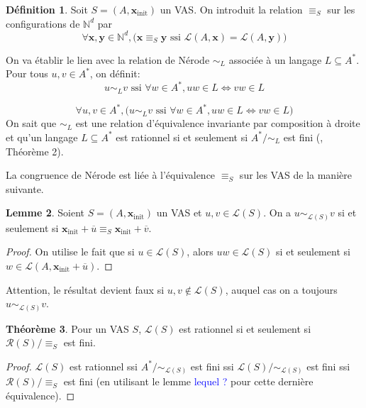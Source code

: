 \documentclass[a4paper,final]{article}
\theoremstyle{definition}
\newtheorem{Theorem}{Théorème}
\newtheorem{Definition}[Theorem]{Définition}
\newtheorem{Lemma}[Theorem]{Lemme}
\newcommand{\alain}[1]{\textcolor{blue}{#1}}
\newcommand{\N}{\ensuremath{\mathbb{N}}}
\newcommand{\lang}{\ensuremath{\mathcal{L}}}
\newcommand{\conf}{\ensuremath{\mathcal{R}}}
\newcommand{\vect}[1]{\ensuremath{\mathbf{#1}}}
\newcommand{\rel}{\ensuremath{\equiv}}
\newcommand{\ssi}{\ensuremath{\text{ ssi }}}
\newcommand{\equivaut}{\ensuremath{\Leftrightarrow}}
\newcommand{\xinit}{\ensuremath{\vect{x}_\text{init}}}
\newcommand{\valeur}[1]{\ensuremath{\overline{#1}}}
\begin{document}
\begin{Definition}
Soit $S=(A,\xinit)$ un VAS. On introduit la relation $\rel_S$ sur les configurations de $\N^d$ par
$$\forall \vect{x},\vect{y}\in\N^d, \Big(
\vect{x} \rel_S \vect{y} \ssi \lang(A,\vect{x}) = \lang(A,\vect{y}) \Big)$$
\end{Definition}


On va établir le lien avec la relation de Nérode $\sim_L$ associée à un langage $L \subseteq A^*$. Pour tous $u,v\in A^\ast$, on définit: 
 $$ u\sim_L v \ssi \forall w\in A^\ast, uw\in L \equivaut vw\in L $$

 $$\forall u,v\in A^\ast, \Big( u\sim_L v \ssi \forall w\in A^\ast, uw\in L \equivaut vw\in L \Big)$$
On sait que $\sim_L$ est une relation d'équivalence invariante par composition à droite et qu'un langage $L \subseteq A^*$ est rationnel si et seulement si $A^*/\sim_L$ est fini (\cite{rasc59}, Théorème 2).


La congruence de Nérode est liée à l'équivalence $ \rel_S$ sur les VAS de la manière suivante.

\begin{Lemma}
    Soient $S=(A,\xinit)$ un VAS et $u,v\in\lang(S)$.
    On a $u\sim_{\lang(S)}v$ si et seulement si $\xinit +\valeur{u} \rel_S \xinit +\valeur{v}$.
\end{Lemma}

\begin{proof}
On utilise le fait que si $u\in\lang(S)$, alors
$uw\in\lang(S)$ si et seulement si $w\in\lang(A,\xinit +\valeur{u})$.
\end{proof}

Attention, le résultat devient faux si $u,v\notin\lang(S)$, auquel cas on a toujours $u\sim_{\lang(S)}v$.


\begin{Theorem}
    Pour un VAS $S$, $\lang(S)$ est rationnel si et seulement si $\conf(S)/\rel_S$ est fini.
\end{Theorem}

\begin{proof}
$\lang(S)$ est rationnel 
ssi $A^\ast/\sim_{\lang(S)}$ est fini 
ssi $\lang(S)/\sim_{\lang(S)}$ est fini 
ssi $\conf(S)/\rel_S$ est fini (en utilisant le lemme \alain{lequel ?} pour cette dernière équivalence).
\end{proof}
\end{document}
